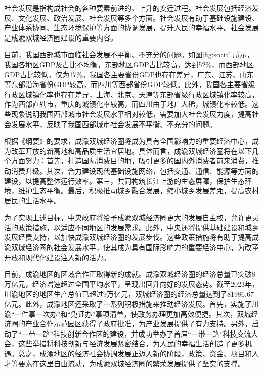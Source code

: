 \documentclass{CjC}
\begin{document}
社会发展是指构成社会的各种要素前进的、上升的变迁过程。社会发展包括经济发展、文化发展、政治发展、社会发展等多个方面。社会发展有助于基础设施建设、产业体系协同、生态环境保护等方面的协调发展，提升人民的幸福水平。社会发展是成渝双城经济圈建设的重要内容。


目前，我国西部城市面临社会发展不平衡、不充分的问题\cite{熊杨2009西部地区经济社会发展水平分析}。如图\ref{fig:social}所示，我国各地区GDP及占比不均衡，东部地区GDP占比较高，达到52\%，而西部地区GDP占比较低，仅为17\%。我国各主要省份GDP也存在差异，广东、江苏、山东等东部沿海省份GDP较高，而四川等西部省份GDP较低。此外，我国各主要省级行政区城镇化率也存在差异，上海、北京、天津等东部省级行政区城镇化率较高，作为西部直辖市，重庆的城镇化率较高，而四川由于地广人稀，城镇化率较低\cite{杨亮洁2021成渝城市群城镇化与生态环境耦合协调及交互影响}。这些现象说明我国西部城市社会发展水平相对较低，需要加大社会发展力度，提高社会发展水平，反映了我国西部城市社会发展不平衡、不充分的问题\cite{何雄浪2010成渝经济区产业结构调整与经济发展研究,许旭2010成渝经济区县域经济实力的时空差异分析,吴江2007成渝经济区产业结构与就业结构的实证分析}。

根据《纲要》的要求，成渝双城经济圈将成为具有全国影响力的重要经济中心，成为改革开放的新高地和高品质生活宜居地。具体而言，成渝双城经济圈将在以下几个方面努力：首先，打造国际消费目的地，吸引更多的国内外消费者前来消费，推动消费升级。其次，合力建设现代基础设施网络，包括交通、通信、能源等方面的建设，以提高整体运行效率。第三，共同构筑长江上游的生态屏障，保护生态环境，维护生态平衡。最后，积极推动城乡融合发展，缩小城乡发展差距，提高农村居民的生活水平。

为了实现上述目标，中央政府将给予成渝双城经济圈更大的发展自主权，允许更灵活的政策措施，以适应不同地区的发展需求。此外，中央还将提供基础建设和城乡发展经费支持，以加快成渝双城经济圈的发展步伐。这些政策措施将有助于提高成渝双城经济圈的社会发展水平，使其成为具有国际影响力的重要经济中心，为改革开放和现代化建设注入新的活力。

目前，成渝地区的区域合作正取得新的成就。成渝双城经济圈的经济总量已突破8万亿元，经济增速超过全国平均水平，呈现出回升向好的发展态势。截至2023年，川渝地区的地区生产总值已超过9万亿元，双城经济圈的经济总量达到了81986.67亿元。此外，成渝地区还采取了一系列积极措施来推动经济发展。首先，实施了川渝“一件事一次办”和“免证办”事项清单，使政务办理更加高效便捷。其次，双城经济圈的产业合作示范园区获得了政府批准，为产业发展提供了有力支持。另外，启动了“一带一路”科技创新合作区的建设，并成功举办了首届“一带一路”科技交流大会，这些举措将科技创新与经济发展紧密结合，为人民的幸福生活创造了更多机遇\cite{黄承锋2016一带一路,陈文玲2016一带一路与长江经济带战略构想内涵与战略意义}。总之，成渝地区的经济社会协调发展正迈入新的阶段，政策、资金、项目和人才等要素在这里自由流动，为成渝双城经济圈的繁荣发展提供了坚实的支撑。
\end{document}

